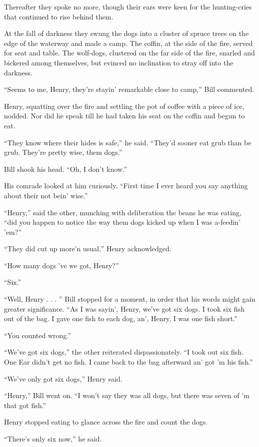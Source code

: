 Thereafter they spoke no more, though their ears were keen for the
hunting-cries that continued to rise behind them.

At the fall of darkness they swung the dogs into a cluster of spruce
trees on the edge of the waterway and made a camp. The coffin, at the
side of the fire, served for seat and table. The wolf-dogs, clustered
on the far side of the fire, snarled and bickered among themselves, but
evinced no inclination to stray off into the darkness.

“Seems to me, Henry, they’re stayin’ remarkable close to camp,” Bill
commented.

Henry, squatting over the fire and settling the pot of coffee with a
piece of ice, nodded. Nor did he speak till he had taken his seat on
the coffin and begun to eat.

“They know where their hides is safe,” he said. “They’d sooner eat grub
than be grub. They’re pretty wise, them dogs.”

Bill shook his head. “Oh, I don’t know.”

His comrade looked at him curiously. “First time I ever heard you say
anything about their not bein’ wise.”

“Henry,” said the other, munching with deliberation the beans he was
eating, “did you happen to notice the way them dogs kicked up when I
was a-feedin’ ’em?”

“They did cut up more’n usual,” Henry acknowledged.

“How many dogs ’ve we got, Henry?”

“Six.”

“Well, Henry . . . ” Bill stopped for a moment, in order that his words
might gain greater significance. “As I was sayin’, Henry, we’ve got six
dogs. I took six fish out of the bag. I gave one fish to each dog, an’,
Henry, I was one fish short.”

“You counted wrong.”

“We’ve got six dogs,” the other reiterated dispassionately. “I took out
six fish. One Ear didn’t get no fish. I came back to the bag afterward
an’ got ’m his fish.”

“We’ve only got six dogs,” Henry said.

“Henry,” Bill went on. “I won’t say they was all dogs, but there was
seven of ’m that got fish.”

Henry stopped eating to glance across the fire and count the dogs.

“There’s only six now,” he said.

